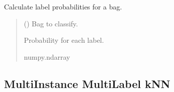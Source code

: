\documentclass[letterpaper,10pt,english]{sphinxmanual}
\begin{document}
\begin{fulllineitems}
\begin{fulllineitems}
\label{\detokenize{classifier/lazy/index:miml.classifier.miml.lazy.miml_map_knn.MIMLMAPkNN.predict_proba_bag}}
\pysigstartsignatures
\pysiglinewithargsret
{}
{}
{}
\pysigstopsignatures
\sphinxAtStartPar
Calculate label probabilities for a bag.
\begin{quote}\begin{description}
\sphinxAtStartPar
{} ({\hyperref[\detokenize{data/_autosummary/miml.data.bag.Bag:miml.data.bag.Bag}]{}}) \textendash{} Bag to classify.

\sphinxAtStartPar
Probability for each label.

\sphinxAtStartPar
numpy.ndarray

\end{description}\end{quote}

\end{fulllineitems}


\end{fulllineitems}



\subsection{Multi\sphinxhyphen{}Instance Multi\sphinxhyphen{}Label kNN}
\label{\detokenize{classifier/lazy/index:multi-instance-multi-label-knn}}
\end{document}
